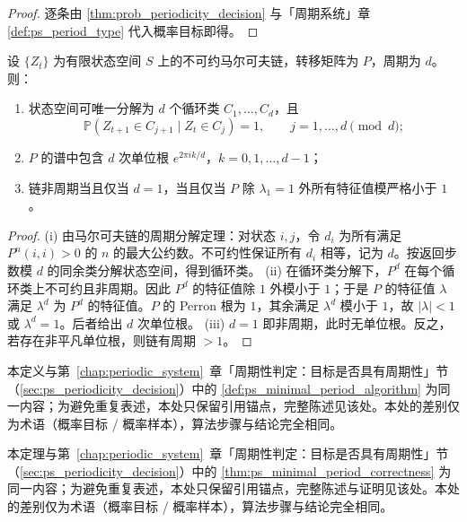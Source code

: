 \begin{proof}
逐条由 \cref{thm:prob_periodicity_decision} 与「周期系统」章 \cref{def:ps_period_type} 代入概率目标即得。
\end{proof}

\begin{lemma}[有限马尔可夫链的周期判定]\label{lem:markov_period}
设 $\{Z_t\}$ 为有限状态空间 $S$ 上的不可约马尔可夫链，转移矩阵为 $P$，周期为 $d$。则：
\begin{enumerate}[label=(\roman*)]
    \item 状态空间可唯一分解为 $d$ 个循环类 $C_1,\dots,C_d$，且
    \[
    \mathbb P(Z_{t+1}\in C_{j+1}\mid Z_t\in C_j)=1,\qquad j=1,\dots,d\pmod d;
    \]
    \item $P$ 的谱中包含 $d$ 次单位根 $e^{2\pi i k/d}$，$k=0,1,\dots,d-1$；
    \item 链非周期当且仅当 $d=1$，当且仅当 $P$ 除 $\lambda_1=1$ 外所有特征值模严格小于 $1$。
\end{enumerate}
\end{lemma}

\begin{proof}
(i) 由马尔可夫链的周期分解定理：对状态 $i,j$，令 $d_i$ 为所有满足 $P^n(i,i)>0$ 的 $n$ 的最大公约数。不可约性保证所有 $d_i$ 相等，记为 $d$。按返回步数模 $d$ 的同余类分解状态空间，得到循环类。
(ii) 在循环类分解下，$P^d$ 在每个循环类上不可约且非周期。因此 $P^d$ 的特征值除 $1$ 外模小于 $1$；于是 $P$ 的特征值 $\lambda$ 满足 $\lambda^d$ 为 $P^d$ 的特征值。$P$ 的 Perron 根为 $1$，其余满足 $\lambda^d$ 模小于 $1$，故 $|\lambda|<1$ 或 $\lambda^d=1$。后者给出 $d$ 次单位根。
(iii) $d=1$ 即非周期，此时无单位根。反之，若存在非平凡单位根，则链有周期 $>1$。
\end{proof}

\begin{definition}[概率最小正周期算法]\label{def:prob_minimal_period_algorithm}
本定义与第~\ref{chap:periodic_system}~章「周期性判定：目标是否具有周期性」节（\cref{sec:ps_periodicity_decision}）中的 \cref{def:ps_minimal_period_algorithm} 为同一内容；为避免重复表述，本处只保留引用锚点，完整陈述见该处。本处的差别仅为术语（概率目标 / 概率样本），算法步骤与结论完全相同。
\end{definition}

\begin{theorem}[概率最小正周期算法的正确性]\label{thm:prob_minimal_period_correctness}
本定理与第~\ref{chap:periodic_system}~章「周期性判定：目标是否具有周期性」节（\cref{sec:ps_periodicity_decision}）中的 \cref{thm:ps_minimal_period_correctness} 为同一内容；为避免重复表述，本处只保留引用锚点，完整陈述与证明见该处。本处的差别仅为术语（概率目标 / 概率样本），算法步骤与结论完全相同。
\end{theorem}

